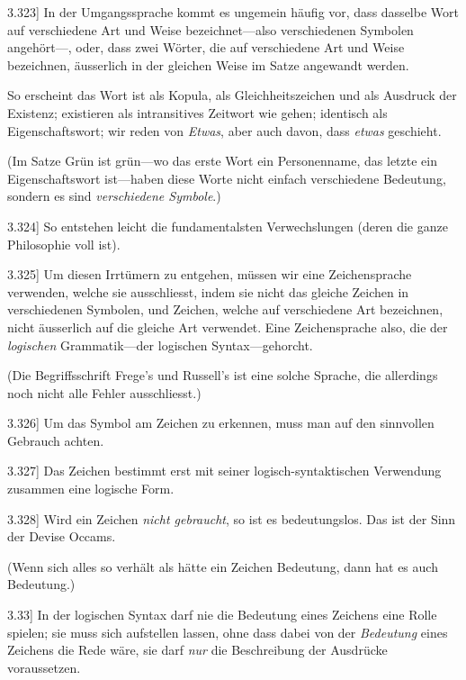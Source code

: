 \documentclass[12pt,oneside]{book}[2007/10/19]
\newcommand{\PropERef}[1]{\hyperref[PropE:#1]{#1}}
\newcommand{\PropositionG}[2]{%
  \item[\phantomsection\label{PropG:#1}\PropERef{#1}] #2%
}
\newcommand{\Emph}[1]{\emph{#1}}%
\begin{document}
\begin{propositions}
\PropositionG{3.323}
{In der Umgangssprache kommt es ungemein
häufig vor, dass dasselbe Wort auf verschiedene
Art und Weise bezeichnet---also verschiedenen
Symbolen an\-ge\-hört---, oder, dass zwei Wörter,
die auf verschiedene Art und Weise bezeichnen,
äusserlich in der gleichen Weise im Satze angewandt
werden.

So erscheint das Wort \glqq{}ist\grqq{} als Kopula, als
Gleichheitszeichen und als Ausdruck der Existenz;
\glqq{}existieren\grqq{} als intransitives Zeitwort wie \glqq{}gehen\grqq{};
\glqq{}identisch\grqq{} als Eigenschaftswort; wir reden von
\Emph{Etwas}, aber auch davon, dass \Emph{etwas} geschieht.

(Im Satze \glqq{}Grün ist grün\grqq{}---wo das erste Wort
ein Personenname, das letzte ein Eigenschaftswort
ist---haben diese Worte nicht einfach verschiedene
Bedeutung, sondern es sind \Emph{verschiedene
Symbole}.)}


\PropositionG{3.324}
{So entstehen leicht die fundamentalsten Verwechslungen
(deren die ganze Philosophie voll
ist).}


\PropositionG{3.325}
{Um diesen Irrtümern zu entgehen, müssen
wir eine Zeichensprache verwenden, welche sie
ausschliesst, indem sie nicht das gleiche Zeichen
in verschiedenen Symbolen, und Zeichen, welche
auf verschiedene Art bezeichnen, nicht äusserlich
auf die gleiche Art verwendet. Eine Zeichensprache
also, die der \Emph{logischen} Grammatik---der logischen
Syntax---gehorcht.

(Die Begriffsschrift Frege's und Russell's ist
eine solche Sprache, die allerdings noch nicht alle
Fehler ausschliesst.)}


\PropositionG{3.326}
{Um das Symbol am Zeichen zu erkennen, muss
man auf den sinnvollen Gebrauch achten.}


\PropositionG{3.327}
{Das Zeichen bestimmt erst mit seiner logisch-syntaktischen
Verwendung zusammen eine logische
Form.}


\PropositionG{3.328}
{Wird ein Zeichen \Emph{nicht gebraucht}, so ist
es bedeutungslos. Das ist der Sinn der Devise
Occams.

(Wenn sich alles so verhält als hätte ein Zeichen
Bedeutung, dann hat es auch Bedeutung.)}


\PropositionG{3.33}
{In der logischen Syntax darf nie die Bedeutung
eines Zeichens eine Rolle spielen; sie muss sich
aufstellen lassen, ohne dass dabei von der \Emph{Bedeutung}
eines Zeichens die Rede wäre, sie darf \Emph{nur}
die Beschreibung der Ausdrücke voraussetzen.}



\end{propositions}
\end{document}
